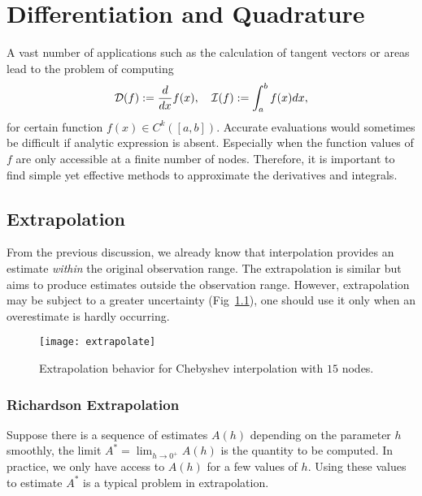 \chapter{Differentiation and Quadrature}
\label{Ch: 3-Dif-Qua}
A vast number of applications such as the calculation of tangent vectors or areas lead to the problem of computing 
\begin{equation}
    \mathcal D(f) := \frac{d}{dx} f(x),\quad \mathcal I(f) := \int_a^b f(x) dx, 
\end{equation}
for certain function $f(x)\in C^k([a, b])$. Accurate evaluations would sometimes be difficult if analytic expression is absent. Especially when the function values of $f$ are only accessible at a finite number of nodes. Therefore, it is important to find simple yet effective methods to approximate the derivatives and integrals. 

\section{Extrapolation}
\label{Sec: 3-Ext}
From the previous discussion, we already know that interpolation provides an estimate \emph{within} the original observation range. The extrapolation is similar but aims to produce estimates outside the observation range. However, extrapolation may be subject to a greater uncertainty (Fig~\ref{FIG: EXTRAPO}), one should use it only when an overestimate is hardly occurring.
\begin{figure}[!htb]
    \centering
    \texttt{[image: extrapolate]}
    \caption{Extrapolation behavior for Chebyshev interpolation with $15$ nodes.}
    \label{FIG: EXTRAPO}
\end{figure}

\subsection{Richardson Extrapolation}
\label{SSec: 3-Ric-Ext}
Suppose there is a sequence of estimates $A(h)$ depending on the parameter $h$ smoothly, the limit $A^{\ast} = \lim_{h\to 0^{+}} A(h)$ is the quantity to be computed. In practice, we only have access to $A(h)$ for a few values of $h$. Using these values to estimate $A^{\ast}$ is a typical problem in extrapolation. 

